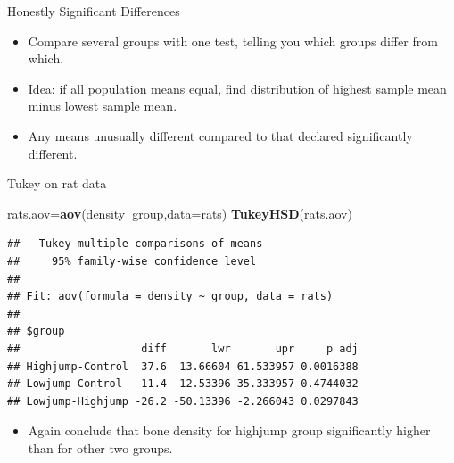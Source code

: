 \documentclass[
  ignorenonframetext,
]{beamer}
\newenvironment{Shaded}{\begin{snugshade}}{\end{snugshade}}
\newcommand{\DataTypeTok}[1]{\textcolor[rgb]{0.13,0.29,0.53}{#1}}
\newcommand{\KeywordTok}[1]{\textcolor[rgb]{0.13,0.29,0.53}{\textbf{#1}}}
\newcommand{\NormalTok}[1]{#1}
\newcommand{\OperatorTok}[1]{\textcolor[rgb]{0.81,0.36,0.00}{\textbf{#1}}}
\providecommand{\tightlist}{%
  \setlength{\itemsep}{0pt}\setlength{\parskip}{0pt}}
\begin{document}
\begin{frame}{Honestly Significant Differences}
\protect\hypertarget{honestly-significant-differences}{}

\begin{itemize}
\tightlist
\item
  Compare several groups with one test, telling you which groups differ
  from which.
\item
  Idea: if all population means equal, find distribution of highest
  sample mean minus lowest sample mean.
\item
  Any means unusually different compared to that declared significantly
  different.
\end{itemize}

\end{frame}

\begin{frame}[fragile]{Tukey on rat data}
\protect\hypertarget{tukey-on-rat-data}{}

\small

\begin{Shaded}
\begin{Highlighting}[]
\NormalTok{rats.aov=}\KeywordTok{aov}\NormalTok{(density}\OperatorTok{~}\NormalTok{group,}\DataTypeTok{data=}\NormalTok{rats)}
\KeywordTok{TukeyHSD}\NormalTok{(rats.aov)}
\end{Highlighting}
\end{Shaded}

\begin{verbatim}
##   Tukey multiple comparisons of means
##     95% family-wise confidence level
## 
## Fit: aov(formula = density ~ group, data = rats)
## 
## $group
##                   diff       lwr       upr     p adj
## Highjump-Control  37.6  13.66604 61.533957 0.0016388
## Lowjump-Control   11.4 -12.53396 35.333957 0.4744032
## Lowjump-Highjump -26.2 -50.13396 -2.266043 0.0297843
\end{verbatim}

\normalsize

\begin{itemize}
\tightlist
\item
  Again conclude that bone density for highjump group significantly
  higher than for other two groups.
\end{itemize}

\end{frame}
\end{document}
